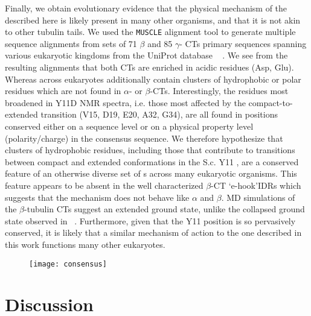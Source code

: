 Finally, we obtain evolutionary evidence that the physical mechanism of the \gct described here is likely present in many other organisms, and that it is not akin to other tubulin tails.  We used the \texttt{MUSCLE} alignment tool \cite{edgar2004muscle} to generate multiple sequence alignments from sets of 71 $\beta$ and 85 $\gamma$- CTs primary sequences spanning various eukaryotic kingdoms from the UniProt database ~\cite{apweiler2004uniprot} .  We see from the resulting alignments that both CTs are enriched in acidic residues (Asp, Glu). Whereas \gct across eukaryotes additionally contain clusters of hydrophobic or polar residues which are not found in $\alpha$- or $\beta$-CTs. Interestingly, the residues most broadened in Y11D NMR spectra, i.e. those most affected by the compact-to-extended transition (V15, D19, E20, A32, G34), are all found in positions conserved either on a sequence level or on a physical property level (polarity/charge) in the consensus \gct sequence. We therefore hypothesize that clusters of hydrophobic residues, including those that contribute to transitions between compact and extended conformations in the S.c. Y11 \gct, are a conserved feature of an otherwise diverse set of \gct s across many eukaryotic organisms. This feature appears to be absent in the well characterized $\beta$-CT \lq e-hook\rq IDRs which suggests that the \gct mechanism does not behave like $\alpha$ and $\beta$. MD simulations of the $\beta$-tubulin CTs suggest an extended ground state, unlike the collapsed ground state observed in \gct ~\cite{luchko2008conformational}.   Furthermore, given that the Y11 position is so pervasively conserved, it is likely that a similar mechanism of action to the one described in this work functions many other eukaryotes.

\begin{figure}
\centering
\texttt{[image: consensus]}
\label{fig:alignment}
\end{figure}

\section{Discussion}

